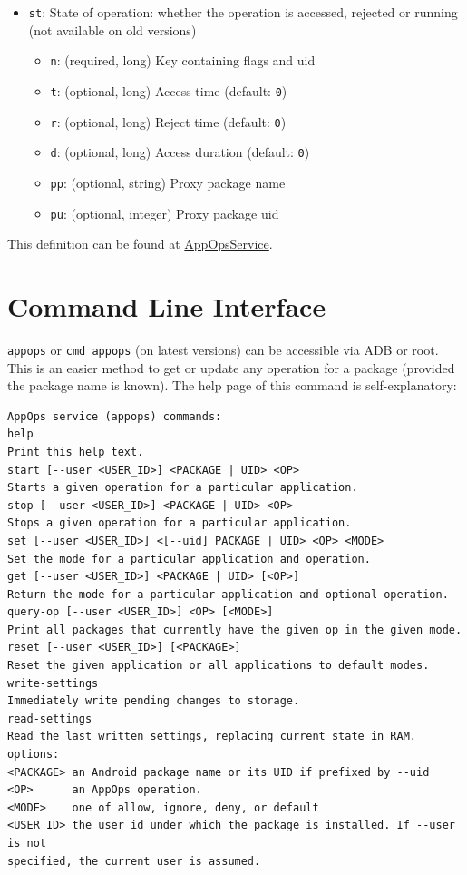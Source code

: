 \begin{itemize}
    \item \texttt{st}: State of operation: whether the operation is accessed, rejected or running (not available on old versions)
    \begin{itemize}
        \item \texttt{n}: (required, long) Key containing flags and uid
        \item \texttt{t}: (optional, long) Access time (default: \texttt{0})
        \item \texttt{r}: (optional, long) Reject time (default: \texttt{0})
        \item \texttt{d}: (optional, long) Access duration (default: \texttt{0})
        \item \texttt{pp}: (optional, string) Proxy package name
        \item \texttt{pu}: (optional, integer) Proxy package uid
    \end{itemize}
\end{itemize}

This definition can be found at
\href{https://android.googlesource.com/platform/frameworks/base/+/master/services/core/java/com/android/server/appop/AppOpsService.java}{AppOpsService}.

\section{Command Line Interface}\label{sec:appops-cli}
\texttt{appops} or \texttt{cmd appops} (on latest versions) can be accessible via ADB or root. This is an easier method
to get or update any operation for a package (provided the package name is known). The help page of this command is
self-explanatory:

\begin{Verbatim}
AppOps service (appops) commands:
help
Print this help text.
start [--user <USER_ID>] <PACKAGE | UID> <OP>
Starts a given operation for a particular application.
stop [--user <USER_ID>] <PACKAGE | UID> <OP>
Stops a given operation for a particular application.
set [--user <USER_ID>] <[--uid] PACKAGE | UID> <OP> <MODE>
Set the mode for a particular application and operation.
get [--user <USER_ID>] <PACKAGE | UID> [<OP>]
Return the mode for a particular application and optional operation.
query-op [--user <USER_ID>] <OP> [<MODE>]
Print all packages that currently have the given op in the given mode.
reset [--user <USER_ID>] [<PACKAGE>]
Reset the given application or all applications to default modes.
write-settings
Immediately write pending changes to storage.
read-settings
Read the last written settings, replacing current state in RAM.
options:
<PACKAGE> an Android package name or its UID if prefixed by --uid
<OP>      an AppOps operation.
<MODE>    one of allow, ignore, deny, or default
<USER_ID> the user id under which the package is installed. If --user is not
specified, the current user is assumed.
\end{Verbatim}
